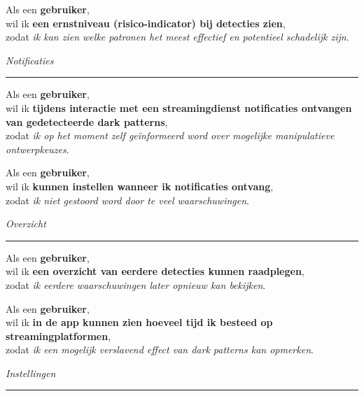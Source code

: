 \vspace{1em}

Als een \textbf{gebruiker}, \\
wil ik \textbf{een ernstniveau (risico-indicator) bij detecties zien}, \\
zodat \textit{ik kan zien welke patronen het meest effectief en potentieel schadelijk zijn}.



\vspace{1.2em}

\textit{Notificaties}
\vspace{0.5em}
\hrule
\vspace{1.2em}

Als een \textbf{gebruiker}, \\
wil ik \textbf{tijdens interactie met een streamingdienst notificaties ontvangen van gedetecteerde dark patterns}, \\
zodat \textit{ik op het moment zelf geïnformeerd word over mogelijke manipulatieve ontwerpkeuzes}.

\vspace{1em}

Als een \textbf{gebruiker}, \\
wil ik \textbf{kunnen instellen wanneer ik notificaties ontvang}, \\
zodat \textit{ik niet gestoord word door te veel waarschuwingen}.


\vspace{1.2em}

\textit{Overzicht}
\vspace{0.5em}
\hrule
\vspace{1.2em}

Als een \textbf{gebruiker}, \\
wil ik \textbf{een overzicht van eerdere detecties kunnen raadplegen}, \\
zodat \textit{ik eerdere waarschuwingen later opnieuw kan bekijken}.

\vspace{1em}

Als een \textbf{gebruiker}, \\
wil ik \textbf{in de app kunnen zien hoeveel tijd ik besteed op streamingplatformen}, \\
zodat \textit{ik een mogelijk verslavend effect van dark patterns kan opmerken}.


\newpage

\textit{Instellingen}
\vspace{0.5em}
\hrule
\vspace{1.2em}

